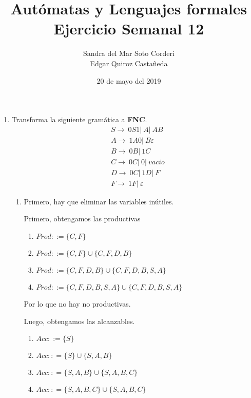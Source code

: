 \documentclass{article}
\begin{document}
\title{
    Autómatas y Lenguajes formales \\
    Ejercicio Semanal 12
}

\author{
    Sandra del Mar Soto Corderi \\
    Edgar Quiroz Castañeda
}

\date{
    20 de mayo del 2019
}

\maketitle

\begin{enumerate}
    \item Transforma la siguiente gramática a \textbf{FNC}.
    \begin{align*}
        &S \rightarrow \ 0S1 |\ A |\ AB \\
        &A \rightarrow \ 1A0 |\ B\varepsilon \\
        &B \rightarrow \ 0B |\ 1C \\
        &C \rightarrow \ 0C |\ 0 |\ vacio \\
        &D \rightarrow \ 0C |\ 1D |\ F \\
        &F \rightarrow \ 1F |\ \varepsilon
    \end{align*}
    \begin{enumerate}
        \item Primero, hay que eliminar las variables inútiles.
        
        Primero, obtengamos las productivas
        \begin{enumerate}
        	\item $Prod ::= \{C, F\}$
        	\item $Prod ::= \{C, F\} \cup \{C, F, D, B\}$
        	\item $Prod ::= \{C, F, D, B\} \cup \{C, F, D, B, S, A\}$
        	\item $Prod ::= \{C, F, D, B, S, A\} \cup \{C, F, D, B, S, A\}$
        \end{enumerate}
        
        Por lo que no hay no productivas.
        
        Luego, obtengamos las alcanzables.
        \begin{enumerate}
            \item $Acc ::= \{S\}$
            \item $Acc :: = \{S\} \cup \{S, A, B\}$
            \item $Acc :: = \{S, A, B\} \cup \{S, A, B, C\}$
            \item $Acc :: = \{S, A, B, C\} \cup \{S, A, B, C\}$
        \end{enumerate}


\end{enumerate}
\end{enumerate}
\end{document}
